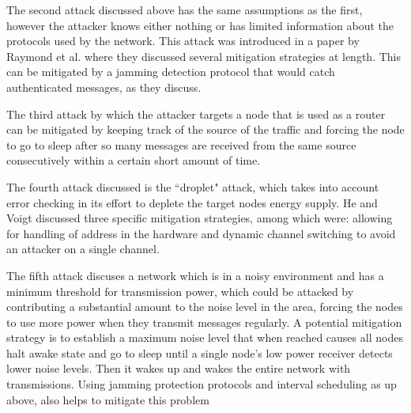 The second attack discussed above has the same assumptions as the first, however the attacker knows either nothing or has limited information about the protocols used by the network. This attack was introduced in a paper by
Raymond et al. where they discussed several mitigation strategies at length\cite{4476299}. This can be mitigated by a jamming detection protocol that would catch authenticated messages, as they discuss. 

The third attack by which the attacker targets a node that is used as a router can be mitigated by keeping track of the source of the traffic and forcing the node to go to sleep after so many messages are received from the same
source consecutively within a certain short amount of time. 

The fourth attack discussed is the ``droplet" attack, which takes into account error checking in its effort to deplete the target nodes energy supply. He and Voigt discussed three specific mitigation strategies, among which were:
 allowing for handling of address in the hardware and dynamic channel switching to avoid an attacker on a single channel.

The fifth attack discuses a network which is in a noisy environment and has a minimum threshold for transmission power, which could be attacked by contributing a substantial amount to the noise level in the area, forcing the nodes
to use more power when they transmit messages regularly. A potential mitigation strategy is to establish a maximum noise level that when reached causes all nodes halt awake state and go to sleep until a single node's low power receiver detects lower noise levels.
Then it wakes up and wakes the entire network with transmissions. Using jamming protection protocols and interval scheduling as up above, also helps to mitigate this problem\cite{4476299}
 
   
